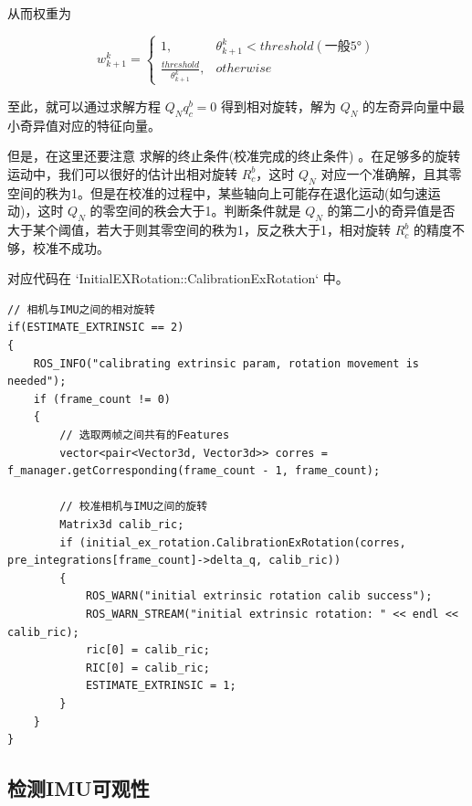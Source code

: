 \documentclass[12pt,a4paper]{article}
\begin{document}
从而权重为

\begin{equation}
w^{k}_{k+1}=
\left\{\begin{matrix}
1, & {\theta}^{k}_{k+1}<threshold  (\text{一般5°}) \\
\frac{threshold}{\theta^{k}_{k+1}}, & otherwise
\end{matrix}\right.
\end{equation}

至此，就可以通过求解方程 $Q_N q_c^b=0$ 得到相对旋转，解为 $Q_N$ 的左奇异向量中最小奇异值对应的特征向量。

但是，在这里还要注意 求解的终止条件(校准完成的终止条件) 。在足够多的旋转运动中，我们可以很好的估计出相对旋转 $R_{c}^{b}$，这时 $Q_{N}$ 对应一个准确解，且其零空间的秩为1。但是在校准的过程中，某些轴向上可能存在退化运动(如匀速运动)，这时 $Q_{N}$ 的零空间的秩会大于1。判断条件就是 $Q_N$ 的第二小的奇异值是否大于某个阈值，若大于则其零空间的秩为1，反之秩大于1，相对旋转 $R_{c}^{b}$ 的精度不够，校准不成功。  

对应代码在 `InitialEXRotation::CalibrationExRotation` 中。

\begin{lstlisting}
// 相机与IMU之间的相对旋转
if(ESTIMATE_EXTRINSIC == 2)
{
    ROS_INFO("calibrating extrinsic param, rotation movement is needed");
    if (frame_count != 0)
    {
        // 选取两帧之间共有的Features
        vector<pair<Vector3d, Vector3d>> corres = f_manager.getCorresponding(frame_count - 1, frame_count);

        // 校准相机与IMU之间的旋转
        Matrix3d calib_ric;
        if (initial_ex_rotation.CalibrationExRotation(corres, pre_integrations[frame_count]->delta_q, calib_ric))
        {
            ROS_WARN("initial extrinsic rotation calib success");
            ROS_WARN_STREAM("initial extrinsic rotation: " << endl << calib_ric);
            ric[0] = calib_ric;
            RIC[0] = calib_ric;
            ESTIMATE_EXTRINSIC = 1;
        }
    }
}
\end{lstlisting}

\subsection{检测IMU可观性}
\end{document}
